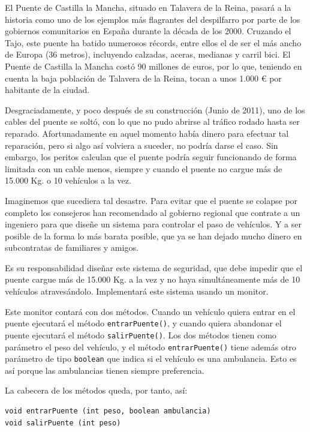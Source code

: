 \documentclass[a4paper]{article}
\newcommand{\code}[1]{\texttt{#1}}
\begin{document}
El Puente de Castilla la Mancha, situado en Talavera de la Reina, pasará a la historia como uno de los ejemplos más flagrantes del despilfarro por parte de los gobiernos comunitarios en España durante la década de los 2000. Cruzando el Tajo, este puente ha batido numerosos récords, entre ellos el de ser el más ancho de Europa (36 metros), incluyendo calzadas, aceras, medianas y carril bici. El Puente de Castilla la Mancha costó 90 millones de euros, por lo que, teniendo en cuenta la baja población de Talavera de la Reina, tocan a unos 1.000 € por habitante de la ciudad.

Desgraciadamente, y poco después de su construcción (Junio de 2011), uno de los cables del puente se soltó, con lo que no pudo abrirse al tráfico rodado hasta ser reparado. Afortunadamente en aquel momento había dinero para efectuar tal reparación, pero si algo así volviera a suceder, no podría darse el caso. Sin embargo, los peritos calculan que el puente podría seguir funcionando de forma limitada con un cable menos, siempre y cuando el puente no cargue más de 15.000 Kg. o 10 vehículos a la vez.

Imaginemos que sucediera tal desastre. Para evitar que el puente se colapse por completo los consejeros han recomendado al gobierno regional que contrate a un ingeniero para que diseñe un sistema para controlar el paso de vehículos. Y a ser posible de la forma lo más barata posible, que ya se han dejado mucho dinero en subcontratas de familiares y amigos.

Es su responsabilidad diseñar este sistema de seguridad, que debe impedir que el puente cargue más de 15.000 Kg. a la vez y no haya simultáneamente más de 10 vehículos atravesándolo. Implementará este sistema usando un monitor.

Este monitor contará con dos métodos. Cuando un vehículo quiera entrar en el puente ejecutará el método \code{entrarPuente()}, y cuando quiera abandonar el puente ejecutará el método \code{salirPuente()}. Los dos métodos tienen como parámetro el peso del vehículo, y el método \code{entrarPuente()} tiene además otro parámetro de tipo \code{boolean} que indica si el vehículo es una ambulancia. Esto es así porque las ambulancias tienen siempre preferencia.

La cabecera de los métodos queda, por tanto, así:

\begin{verbatim}
void entrarPuente (int peso, boolean ambulancia)
void salirPuente (int peso)
\end{verbatim}
\end{document}
